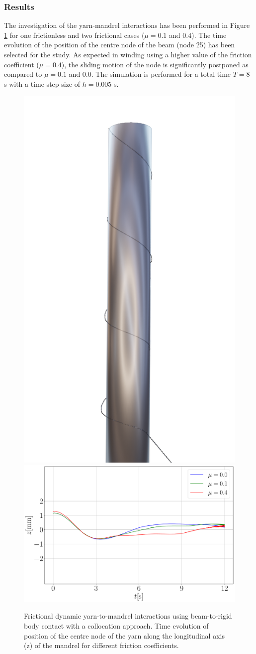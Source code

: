 \subsubsection{Results}
The investigation of the yarn-mandrel interactions has been performed in Figure \ref{fig:fricvalues} for one frictionless and two frictional cases ($\mu = 0.1$ and $0.4$). The time evolution of the position of the centre node of the beam (node 25) has been selected for the study. As expected in winding using a higher value of the friction coefficient ($\mu = 0.4)$, the sliding motion of the node is significantly postponed as compared to $\mu = 0.1$ and $0.0$. The simulation is performed for a total time $T = 8$ s with a time step size of $h = 0.005$ s.

\begin{figure}[h]
\centering
  \centering
  \includegraphics[width=0.27\linewidth]{figures/steel_mandrel_1.png}\\
  \centering
  \includegraphics[width=0.47\linewidth]{figures/mu_compare.pdf}
\caption{Frictional dynamic yarn-to-mandrel interactions using beam-to-rigid body contact with a collocation approach. Time evolution of position of the centre node of the yarn along the longitudinal axis (z) of the mandrel for different friction coefficients.}
\label{fig:fricvalues}
\end{figure}



















